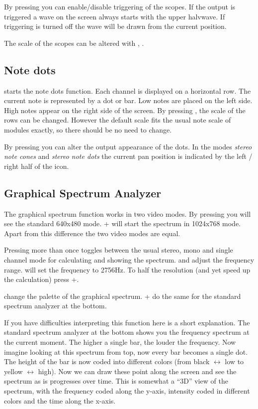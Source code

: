 By pressing  you can enable/disable triggering of the
scopes. If the output is triggered a wave on the screen always starts
with the upper halvwave. If triggering is turned off the wave will be
drawn from the current position.

The scale of the scopes can be altered with ,
.

\subsection{Note dots}
 starts the note dots function. Each channel is displayed on a horizontal row. The current note is represented
by a dot or bar. Low notes are placed on the left side. High notes
appear on the right side of the screen. By pressing ,
 the scale of the rows can be changed. However the
default scale fits the usual note scale of modules exactly, so there
should be no need to change.

By pressing  you can alter the output appearance of the
dots. In the modes \emph{stereo note cones} and \emph{stereo note
dots} the current pan position is indicated by the left / right half
of the icon.

\subsection{Graphical Spectrum Analyzer}
The graphical spectrum function works in two video modes. By pressing
 you will see the standard 640x480 mode. +
will start the spectrum in 1024x768 mode. Apart from this difference
the two video modes are equal.

Pressing  more than once toggles between the usual stereo,
mono and single channel mode for calculating and showing the
spectrum.  and
 adjust the frequency range.  will set the frequency
to 2756Hz. To half the resolution (and yet speed up the calculation)
press
+.

 change the palette of the graphical spectrum. +
do the same for the standard spectrum analyzer at the bottom.

{\small If you have difficulties interpreting this function here is a
short explanation.  The standard spectrum analyzer at the bottom shows
you the frequency spectrum at the current moment. The higher a single
bar, the louder the frequency. Now imagine looking at this spectrum
from top, now every bar becomes a single dot.  The height of the bar
is now coded into different colors (from black $\leftrightarrow$ low
to yellow $\leftrightarrow$ high). Now we can draw these point along
the screen and see the spectrum as is progresses over time. This is
somewhat a ``3D'' view of the spectrum, with the frequency coded along
the y-axis, intensity coded in different colors and the time along the
x-axis.}

